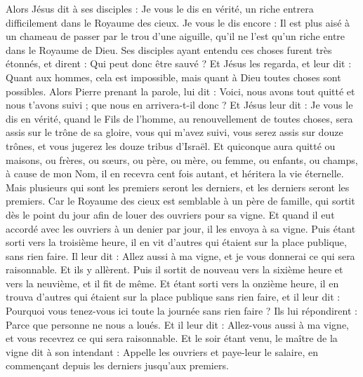 \begin{multicols}{2}
Alors Jésus dit à ses disciples : Je vous le dis en vérité, un riche entrera difficilement dans le Royaume des cieux.
Je vous le dis encore : Il est plus aisé à un chameau de passer par le trou d'une aiguille, qu’il ne l’est qu’un riche entre dans le Royaume de Dieu.
Ses disciples ayant entendu ces choses furent très étonnés, et dirent : Qui peut donc être sauvé ?
Et Jésus les regarda, et leur dit : Quant aux hommes, cela est impossible, mais quant à Dieu toutes choses sont possibles.
Alors Pierre prenant la parole, lui dit : Voici, nous avons tout quitté et nous t'avons suivi ; que nous en arrivera-t-il donc ?
Et Jésus leur dit : Je vous le dis en vérité, quand le Fils de l’homme, au renouvellement de toutes choses, sera assis sur le trône de sa gloire, vous qui m’avez suivi, vous serez assis sur douze trônes, et vous jugerez les douze tribus d'Israël.
Et quiconque aura quitté ou maisons, ou frères, ou sœurs, ou père, ou mère, ou femme, ou enfants, ou champs, à cause de mon Nom, il en recevra cent fois autant, et héritera la vie éternelle.
Mais plusieurs qui sont les premiers seront les derniers, et les derniers seront les premiers.
\VerseOne{} Car le Royaume des cieux est semblable à un père de famille, qui sortit dès le point du jour afin de louer des ouvriers pour sa vigne.
Et quand il eut accordé avec les ouvriers à un denier par jour, il les envoya à sa vigne.
Puis étant sorti vers la troisième heure, il en vit d'autres qui étaient sur la place publique, sans rien faire.
Il leur dit : Allez aussi à ma vigne, et je vous donnerai ce qui sera raisonnable.
Et ils y allèrent. Puis il sortit de nouveau vers la sixième heure et vers la neuvième, et il fit de même.
Et étant sorti vers la onzième heure, il en trouva d'autres qui étaient sur la place publique sans rien faire, et il leur dit : Pourquoi vous tenez-vous ici toute la journée sans rien faire ?
Ils lui répondirent : Parce que personne ne nous a loués. Et il leur dit : Allez-vous aussi à ma vigne, et vous recevrez ce qui sera raisonnable.
Et le soir étant venu, le maître de la vigne dit à son intendant : Appelle les ouvriers et paye-leur le salaire, en commençant depuis les derniers jusqu’aux premiers.

\end{multicols}
